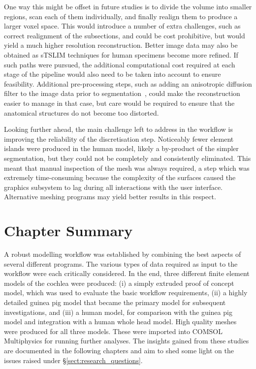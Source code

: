 One way this might be offset in future studies is to divide the volume into
smaller regions, scan each of them individually, and finally realign them to
produce a larger voxel space. This would introduce a number of extra challenges,
such as correct realignment of the subsections, and could be cost prohibitive,
but would yield a much higher resolution reconstruction. Better image data may
also be obtained as sTSLIM techniques for human specimens become more refined.
If such paths were pursued, the additional computational cost required at each
stage of the pipeline would also need to be taken into account to ensure
feasibility. Additional pre-processing steps, such as adding an anisotropic
diffusion filter to the image data prior to
segmentation~\cite{poznyakovskiy2008}, could make the reconstruction easier to
manage in that case, but care would be required to ensure that the anatomical
structures do not become too distorted.

Looking further ahead, the main challenge left to address in the workflow is
improving the reliability of the discretisation step. Noticeably fewer element
islands were produced in the human model, likely a by-product of the simpler
segmentation, but they could not be completely and consistently eliminated. This
meant that manual inspection of the mesh was always required, a step which was
extremely time-consuming because the complexity of the surfaces caused the
graphics subsystem to lag during all interactions with the user interface.
Alternative meshing programs may yield better results in this respect.

\section{Chapter Summary}

A robust modelling workflow was established by combining the best aspects of
several different programs. The various types of data required as input to the
workflow were each critically considered. In the end, three different finite
element models of the cochlea were produced: (i) a simply extruded proof of
concept model, which was used to evaluate the basic workflow requirements, (ii)
a highly detailed guinea pig model that became the primary model for subsequent
investigations, and (iii) a human model, for comparison with the guinea pig
model and integration with a human whole head model. High quality meshes were
produced for all three models. These were imported into COMSOL Multiphysics for
running further analyses. The insights gained from these studies are documented
in the following chapters and aim to shed some light on the issues raised under
\S\ref{sect:research_questions}.
